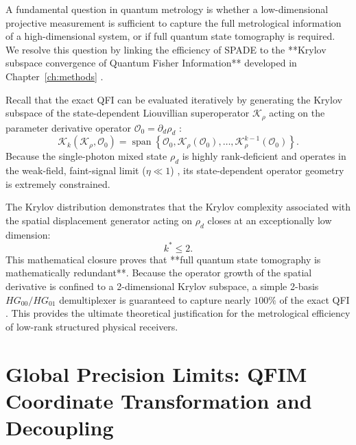 A fundamental question in quantum metrology is whether a low-dimensional projective measurement is sufficient to capture the full metrological information of a high-dimensional system, or if full quantum state tomography is required. We resolve this question by linking the efficiency of SPADE to the **Krylov subspace convergence of Quantum Fisher Information** developed in Chapter~\ref{ch:methods} \cite{KrylovQFI2026}.

Recall that the exact QFI can be evaluated iteratively by generating the Krylov subspace of the state-dependent Liouvillian superoperator $\mathcal{K}_\rho$ acting on the parameter derivative operator $\mathcal{O}_0 = \partial_d \rho_d$ \cite{KrylovQFI2026}:
\begin{equation}
    \mathcal{K}_k\left(\mathcal{K}_\rho, \mathcal{O}_0\right) = \operatorname{span}\left\{\mathcal{O}_0, \mathcal{K}_\rho(\mathcal{O}_0), \dots, \mathcal{K}_\rho^{k-1}(\mathcal{O}_0)\right\}.
    \label{eq:krylov_subspace_link}
\end{equation}
Because the single-photon mixed state $\rho_d$ is highly rank-deficient and operates in the weak-field, faint-signal limit ($\eta \ll 1$) \cite{Santamaria2024single}, its state-dependent operator geometry is extremely constrained.

The Krylov distribution demonstrates that the Krylov complexity associated with the spatial displacement generator acting on $\rho_d$ closes at an exceptionally low dimension:
\begin{equation}
    k^* \le 2.
    \label{eq:krylov_closure}
\end{equation}
This mathematical closure proves that **full quantum state tomography is mathematically redundant**. Because the operator growth of the spatial derivative is confined to a 2-dimensional Krylov subspace, a simple 2-basis $HG_{00}/HG_{01}$ demultiplexer is guaranteed to capture nearly $100\%$ of the exact QFI \cite{KrylovQFI2026}. This provides the ultimate theoretical justification for the metrological efficiency of low-rank structured physical receivers.

\section{Global Precision Limits: QFIM Coordinate Transformation and Decoupling}

